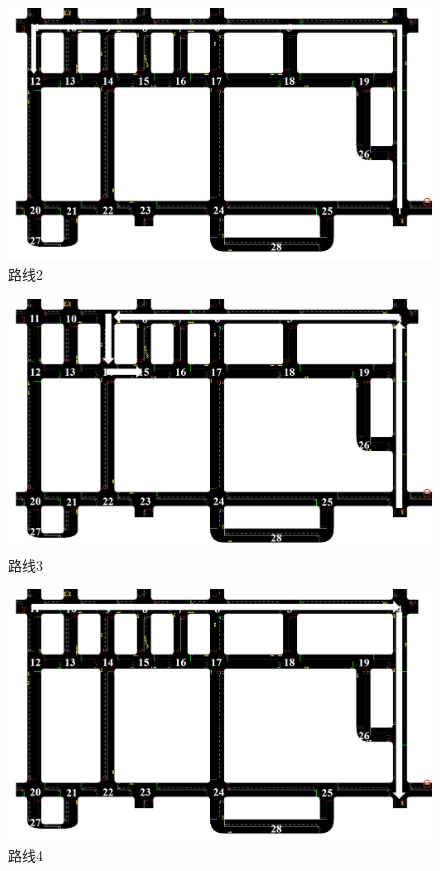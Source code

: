 \begin{figure}[H]
	\centering
	\includegraphics[width=\linewidth]{figures/route2.jpg}
	\caption{路线2}
	\label{fig:route2}
\end{figure}

\begin{figure}[H]
	\centering
	\includegraphics[width=\linewidth]{figures/route3.jpg}
	\caption{路线3}
	\label{fig:route3}
\end{figure}

\begin{figure}[H]
	\centering
	\includegraphics[width=\linewidth]{figures/route4.jpg}
	\caption{路线4}
	\label{fig:route4}
\end{figure}

